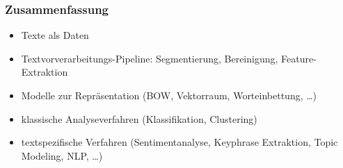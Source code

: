 \begin{frame}
    \frametitle{Zusammenfassung}

    \begin{itemize}
        \item Texte als Daten
        \item Textvorverarbeitungs-Pipeline: Segmentierung, Bereinigung, Feature-Extraktion
        \item Modelle zur Repräsentation (BOW, Vektorraum, Worteinbettung, \dots)
        \item klassische Analyseverfahren (Klassifikation, Clustering)
        \item textspezifische Verfahren (Sentimentanalyse, Keyphrase Extraktion, Topic Modeling, NLP, \dots)
    \end{itemize}
\end{frame}